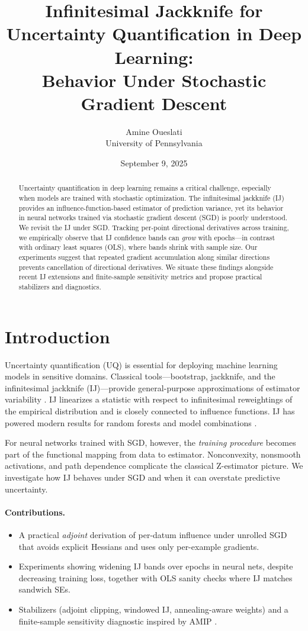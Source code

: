 \documentclass[11pt]{article}
\title{Infinitesimal Jackknife for Uncertainty Quantification in Deep Learning:\\
Behavior Under Stochastic Gradient Descent}
\author{Amine Oueslati\\University of Pennsylvania}
\date{September 9, 2025}
\begin{document}
\maketitle

\begin{abstract}
Uncertainty quantification in deep learning remains a critical challenge, especially when models are trained with stochastic optimization. The infinitesimal jackknife (IJ) provides an influence-function-based estimator of prediction variance, yet its behavior in neural networks trained via stochastic gradient descent (SGD) is poorly understood. We revisit the IJ under SGD. Tracking per-point directional derivatives across training, we empirically observe that IJ confidence bands can \emph{grow} with epochs---in contrast with ordinary least squares (OLS), where bands shrink with sample size. Our experiments suggest that repeated gradient accumulation along similar directions prevents cancellation of directional derivatives. We situate these findings alongside recent IJ extensions and finite-sample sensitivity metrics and propose practical stabilizers and diagnostics.
\end{abstract}

\section{Introduction}
Uncertainty quantification (UQ) is essential for deploying machine learning models in sensitive domains. Classical tools---bootstrap, jackknife, and the infinitesimal jackknife (IJ)---provide general-purpose approximations of estimator variability \citep{jaeckel1972infinitesimal,efron1982jackknife}. IJ linearizes a statistic with respect to infinitesimal reweightings of the empirical distribution and is closely connected to influence functions. IJ has powered modern results for random forests and model combinations \citep{wager2014jackknife,athey2019grf,ghosal2022ijcov,giordano2019swiss}.

For neural networks trained with SGD, however, the \emph{training procedure} becomes part of the functional mapping from data to estimator. Nonconvexity, nonsmooth activations, and path dependence complicate the classical Z-estimator picture. We investigate how IJ behaves under SGD and when it can overstate predictive uncertainty.

\paragraph{Contributions.}
\begin{itemize}
  \item A practical \emph{adjoint} derivation of per-datum influence under unrolled SGD that avoids explicit Hessians and uses only per-example gradients.
  \item Experiments showing widening IJ bands over epochs in neural nets, despite decreasing training loss, together with OLS sanity checks where IJ matches sandwich SEs.
  \item Stabilizers (adjoint clipping, windowed IJ, annealing-aware weights) and a finite-sample sensitivity diagnostic inspired by AMIP \citep{broderick2023amip}.
\end{itemize}
\end{document}
